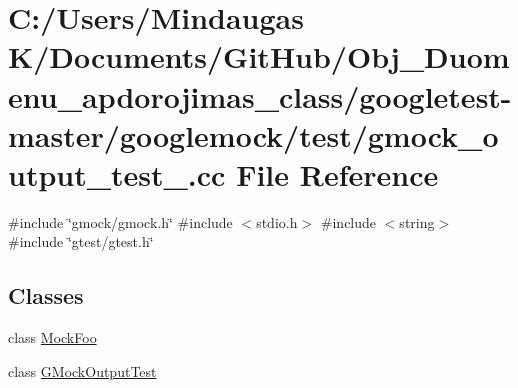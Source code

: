 \hypertarget{googletest-master_2googlemock_2test_2gmock__output__test___8cc}{}\section{C\+:/\+Users/\+Mindaugas K/\+Documents/\+Git\+Hub/\+Obj\+\_\+\+Duomenu\+\_\+apdorojimas\+\_\+class/googletest-\/master/googlemock/test/gmock\+\_\+output\+\_\+test\+\_\+.cc File Reference}
\label{googletest-master_2googlemock_2test_2gmock__output__test___8cc}
{\ttfamily \#include \char`\"{}gmock/gmock.\+h\char`\"{}}\newline
{\ttfamily \#include $<$stdio.\+h$>$}\newline
{\ttfamily \#include $<$string$>$}\newline
{\ttfamily \#include \char`\"{}gtest/gtest.\+h\char`\"{}}\newline
\subsection*{Classes}
\begin{DoxyCompactItemize}
\item 
class \mbox{\hyperlink{class_mock_foo}{Mock\+Foo}}
\item 
class \mbox{\hyperlink{class_g_mock_output_test}{G\+Mock\+Output\+Test}}
\end{DoxyCompactItemize}
